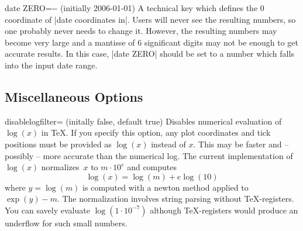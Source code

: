 \begin{pgfplotskey}{date ZERO=-- (initially 2006-01-01)}
	A technical key which defines the $0$ coordinate of |date coordinates in|. Users will never see the resulting numbers, so one probably never needs to change it. However, the resulting numbers may become very large and a mantisse of 6 significant digits may not be enough to get accurate results. In this case, |date ZERO| should be set to a number which falls into the input date range.
\end{pgfplotskey}


\subsection{Miscellaneous Options}
\label{pgfplots:misc}

\begin{pgfplotskey}{disablelogfilter= (initally false, default true)}
Disables numerical evaluation of $\log(x)$ in \TeX. If you specify this option, any plot coordinates and tick positions must be provided as $\log(x)$ instead of $x$. This may be faster and -- possibly -- more accurate than the numerical log. The current implementation of $\log(x)$ normalizes~$x$ to $m\cdot 10^e$ and computes
\[ \log(x) = \log(m) + e \log(10) \]
where $y = \log(m)$ is computed with a newton method applied to $\exp(y) - m$. The normalization involves string parsing without \TeX-registers. You can savely evaluate $\log(1\cdot 10^{-7})$ although \TeX-registers would produce an underflow for such small numbers. 
\end{pgfplotskey}

